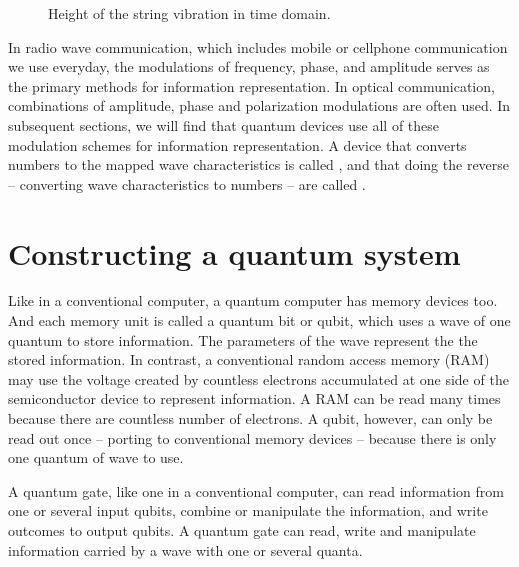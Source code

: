 \documentclass[Letter,11pt]{book}
\begin{document}
\begin{figure}[ht]
\caption{Height of the string vibration in time domain.}
\label{Wave}
\end{figure}

In radio wave communication, which includes mobile or cellphone communication we use everyday, the modulations of frequency, phase, and amplitude serves as the primary methods for information representation. In optical communication, combinations of amplitude, phase and polarization modulations are often used. In subsequent sections, we will find that quantum devices use all of these modulation schemes for information representation. A device that converts numbers to the mapped wave characteristics is called , and that doing the reverse -- converting wave characteristics to numbers -- are called .

\section{Constructing a quantum system}
Like in a conventional computer, a quantum computer has memory devices too. And each memory unit is called a quantum bit or qubit, which uses  a wave of one quantum to store information. The parameters of the wave represent the the stored information. In contrast, a conventional random access memory (RAM) may use the voltage created by countless electrons accumulated at one side of the semiconductor device to represent information. A RAM can be read many times because there are countless number of electrons. A qubit, however, can only be read out once -- porting to conventional memory devices -- because there is only one quantum of wave to use.

A quantum gate, like one in a conventional computer, can read information from one or several input qubits, combine or manipulate the information, and write outcomes to output qubits. A quantum gate can read, write and manipulate information carried by a wave with one or several quanta. 
\end{document}
